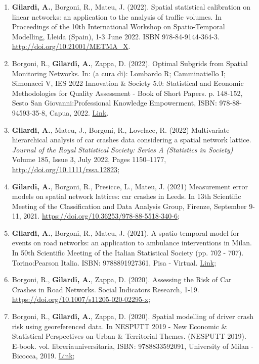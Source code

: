 \documentclass[11pt,a4paper,sans]{moderncv}
\begin{document}
\begin{enumerate}
  \item \textbf{Gilardi, A.}, Borgoni, R., Mateu, J. (2022). Spatial statistical calibration on linear networks: an application to the analysis of traffic volumes. In Proceedings of the 10th International Workshop on Spatio-Temporal Modelling, Lleida (Spain), 1-3 June 2022. ISBN 978-84-9144-364-3. \url{http://doi.org/10.21001/METMA\_X}. 
  \item Borgoni, R., \textbf{Gilardi, A.}, Zappa, D. (2022). Optimal Subgrids from Spatial Monitoring Networks. In: (a cura di): Lombardo R; Camminatiello I; Simonacci V, IES 2022 Innovation \& Society 5.0: Statistical and Economic Methodologies for Quality Assessment - Book of Short Papers. p. 148-152, Sesto San Giovanni:Professional Knowledge Empowerment, ISBN: 978-88-94593-35-8, Capua, 2022.  \href{https://drive.google.com/file/d/1HEZG50lecMyx_NDRLi2Y7d0papiX9ZWO/view}{Link}.
  \item \textbf{Gilardi, A.}, Mateu, J., Borgoni, R., Lovelace, R. (2022) Multivariate hierarchical analysis of car crashes data considering a spatial network lattice. \textit{Journal of the Royal Statistical Society: Series A (Statistics in Society)} Volume 185, Issue 3, July 2022, Pages 1150–1177, \url{http://doi.org/10.1111/rssa.12823};
  \item \textbf{Gilardi, A.}, Borgoni, R., Presicce, L., Mateu, J. (2021) Measurement error models on spatial network lattices: car crashes in Leeds. In 13th Scientific Meeting of the Classification and Data Analysis Group, Firenze, September 9-11, 2021. \url{https://doi.org/10.36253/978-88-5518-340-6}; 
  \item \textbf{Gilardi, A.}, Borgoni, R., Mateu, J. (2021). A spatio-temporal model for events on road networks: an application to ambulance interventions in Milan. In 50th Scientific Meeting of the Italian Statistical Society (pp. 702 - 707). Torino:Pearson Italia. ISBN: 9788891927361, Pisa - Virtual. \href{https://it.pearson.com/content/dam/region-core/italy/pearson-italy/pdf/Docenti/Universit%C3%A0/pearson-sis-book-2021-parte-1.pdf}{Link}; 
  \item Borgoni, R., \textbf{Gilardi, A.}, Zappa, D. (2020). Assessing the Risk of Car Crashes in Road Networks. Social Indicators Research, 1-19. \url{https://doi.org/10.1007/s11205-020-02295-x};
  \item Borgoni, R., \textbf{Gilardi, A.}, Zappa, D. (2020). Spatial modelling of driver crash risk using georeferenced data. In NESPUTT 2019 - New Economic \& Statistical Perspectives on Urban \& Territorial Themes. (NESPUTT 2019). E-book. vol. libreriauniversitaria, ISBN: 9788833592091, University of Milan - Bicocca, 2019. \href{https://www.libreriauniversitaria.it/ebook/9788833592091/autore-riccardo-borgoni/new-economic-statistical-perspectives-on-urban-and-territorial-themes-nesputt-2019-e-book.htm}{Link};

\end{enumerate}
\end{document}
